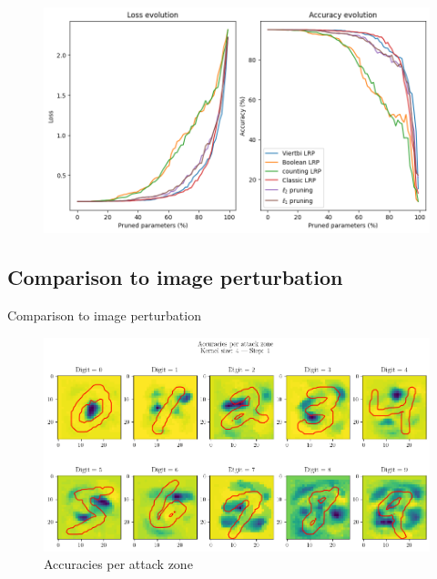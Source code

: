 \documentclass[aspectratio=169]{beamer}
\theoremstyle{definition}
\begin{document}
\begin{frame}
    \begin{figure}
        \includegraphics[width=.9\textwidth]{pruning-graph-large.png}
    \end{figure}
\end{frame}

\subsection{Comparison to image perturbation}
\begin{frame}{Comparison to image perturbation}
    \begin{figure}
        \includegraphics[width=.75\textwidth]{attacks.png}
        \caption{Accuracies per attack zone}
    \end{figure}
\end{frame}

\begin{frame}
    \nocite{*}
    \printbibliography
\end{frame}
\end{document}

